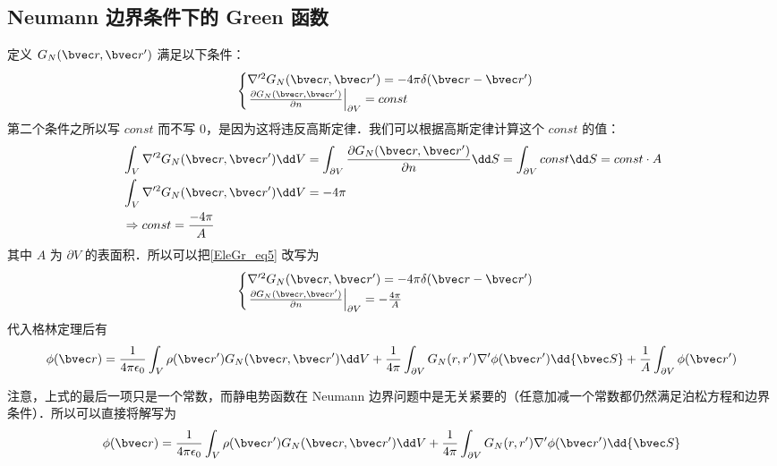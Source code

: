 \subsection{Neumann 边界条件下的 Green 函数}
定义 $G_N(\bvec r,\bvec r')$ 满足以下条件：
\begin{equation}\label{EleGr_eq5}
\begin{cases}
\nabla'^2G_N(\bvec r,\bvec r')=-4\pi\delta(\bvec r-\bvec r')\\
\left.\frac{\partial G_N(\bvec r,\bvec r')}{\partial n}\right|_{\partial V}=const
\end{cases}
\end{equation}
第二个条件之所以写 $const$ 而不写 $0$，是因为这将违反高斯定律．我们可以根据高斯定律计算这个 $const$ 的值：
\begin{equation}
\begin{aligned}
&\int_V \nabla'^2 G_N(\bvec r,\bvec r')\dd V=\int_{\partial V}\frac{\partial G_N(\bvec r,\bvec r')}{\partial n}\dd S=\int_{\partial V}const \dd S=const\cdot A\\
&\int_V \nabla'^2 G_N(\bvec r,\bvec r')\dd V=-4\pi\\
&\Rightarrow const=\frac{-4\pi}{A}
\end{aligned}
\end{equation}
其中 $A$ 为 $\partial V$ 的表面积．所以可以把\autoref{EleGr_eq5} 改写为
\begin{equation}
\begin{cases}
\nabla'^2G_N(\bvec r,\bvec r')=-4\pi\delta(\bvec r-\bvec r')\\
\left.\frac{\partial G_N(\bvec r,\bvec r')}{\partial n}\right|_{\partial V}=-\frac{4\pi}{A}
\end{cases}
\end{equation}
代入格林定理后有
\begin{equation}
\phi(\bvec r)=\frac{1}{4\pi\epsilon_0}\int_V \rho(\bvec r')G_N(\bvec r,\bvec r')\dd V+\frac{1}{4\pi}\int_{\partial V} G_N(r,r')\nabla'\phi(\bvec r')\dd {\bvec S}+\frac{1}{A}\int_{\partial V}\phi(\bvec r')
\end{equation}

注意，上式的最后一项只是一个常数，而静电势函数在 Neumann 边界问题中是无关紧要的（任意加减一个常数都仍然满足泊松方程和边界条件）．所以可以直接将解写为
\begin{equation}\label{EleGr_eq7}
\phi(\bvec r)=\frac{1}{4\pi\epsilon_0}\int_V \rho(\bvec r')G_N(\bvec r,\bvec r')\dd V+\frac{1}{4\pi}\int_{\partial V} G_N(r,r')\nabla'\phi(\bvec r')\dd {\bvec S}
\end{equation}

